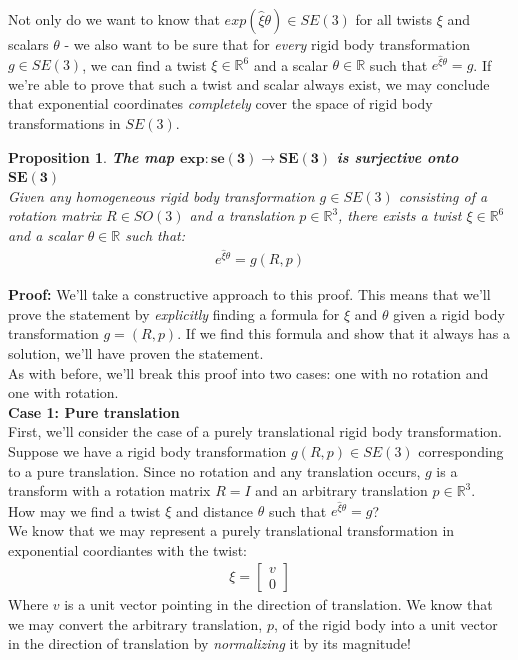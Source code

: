 \documentclass[oneside]{book}
\newtheorem{proposition}{Proposition}
\newenvironment{prop} %
  {\colorlet{shadecolor}{blue!9}\begin{shaded}\begin{proposition}}
  {\end{proposition}\end{shaded}}
\begin{document}
Not only do we want to know that $exp(\hat\xi\theta)\in SE(3)$ for all twists $\xi$ and scalars $\theta$ - we also want to be sure that for \textit{every} rigid body transformation $g \in SE(3)$, we can find a twist $\xi \in \mathbb{R}^6$ and a scalar $\theta \in \mathbb{R}$ such that $e^{\hat\xi\theta} = g$. If we're able to prove that such a twist and scalar always exist, we may conclude that exponential coordinates \textit{completely} cover the space of rigid body transformations in $SE(3)$.
\begin{prop}
\textbf{The map $\mathbf{exp: se(3) \to SE(3)}$ is surjective onto $\mathbf{SE(3)}$}\\
Given any homogeneous rigid body transformation $g \in SE(3)$ consisting of a rotation matrix $R \in SO(3)$ and a translation $p \in \mathbb{R}^3$, there exists a twist $\xi \in \mathbb{R}^6$ and a scalar $\theta \in \mathbb{R}$ such that:
\begin{align}
    e^{\hat\xi\theta} = g(R, p)
\end{align}
\end{prop}
\noindent
\textbf{Proof:} 
We'll take a constructive approach to this proof. This means that we'll prove the statement by \textit{explicitly} finding a formula for $\xi$ and $\theta$ given a rigid body transformation $g = (R, p)$. If we find this formula and show that it always has a solution, we'll have proven the statement.\\
As with before, we'll break this proof into two cases: one with no rotation and one with rotation.\\
\textbf{Case 1: Pure translation}\\
First, we'll consider the case of a purely translational rigid body transformation. Suppose we have a rigid body transformation $g(R, p)\in SE(3)$ corresponding to a pure translation. Since no rotation and any translation occurs, $g$ is a transform with a rotation matrix $R = I$ and an arbitrary translation $p \in \mathbb{R}^3$.\\
How may we find a twist $\xi$ and distance $\theta$ such that $e^{\hat\xi\theta} = g$?\\
We know that we may represent a purely translational transformation in exponential coordiantes with the twist:
\begin{align}
    \xi = 
    \begin{bmatrix}
    v\\
    0
    \end{bmatrix}
\end{align}
Where $v$ is a unit vector pointing in the direction of translation. We know that we may convert the arbitrary translation, $p$, of the rigid body into a unit vector in the direction of translation by \textit{normalizing} it by its magnitude!\\
\end{document}

